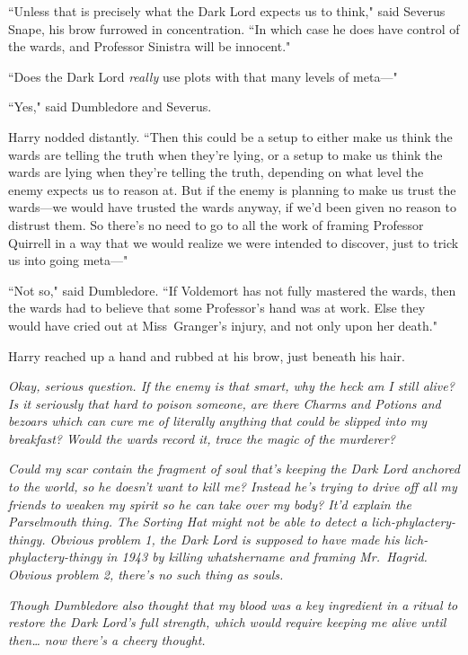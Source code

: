 ``Unless that is precisely what the Dark Lord expects us to think," said Severus Snape, his brow furrowed in concentration. ``In which case he does have control of the wards, and Professor Sinistra will be innocent."

``Does the Dark Lord \emph{really} use plots with that many levels of meta---"

``Yes," said Dumbledore and Severus.

Harry nodded distantly. ``Then this could be a setup to either make us think the wards are telling the truth when they're lying, or a setup to make us think the wards are lying when they're telling the truth, depending on what level the enemy expects us to reason at. But if the enemy is planning to make us trust the wards---we would have trusted the wards anyway, if we'd been given no reason to distrust them. So there's no need to go to all the work of framing Professor Quirrell in a way that we would realize we were intended to discover, just to trick us into going meta---"

``Not so," said Dumbledore. ``If Voldemort has not fully mastered the wards, then the wards had to believe that some Professor's hand was at work. Else they would have cried out at Miss~Granger's injury, and not only upon her death."

Harry reached up a hand and rubbed at his brow, just beneath his hair.

\emph{Okay, serious question. If the enemy is that smart, why the heck am I still alive? Is it seriously that hard to poison someone, are there Charms and Potions and bezoars which can cure me of literally anything that could be slipped into my breakfast? Would the wards record it, trace the magic of the murderer?}

\emph{Could my \emph{scar} contain the fragment of soul that's keeping the Dark Lord anchored to the world, so he doesn't want to kill me? Instead he's trying to drive off all my friends to weaken my spirit so he can take over my body? It'd explain the Parselmouth thing. The Sorting Hat might not be able to detect a lich-phylactery-thingy. Obvious problem 1, the Dark Lord is supposed to have made his lich-phylactery-thingy in 1943 by killing whatshername and framing Mr.~Hagrid. Obvious problem 2, there's no such thing as souls.}

\emph{Though Dumbledore also thought that my blood was a key ingredient in a ritual to restore the Dark Lord's full strength, which would require keeping me alive until then{\ldots} now there's a cheery thought.}

